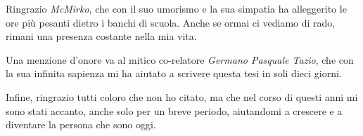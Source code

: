 Ringrazio \textit{McMirko}, che con il suo umorismo e la sua simpatia ha alleggerito le ore più pesanti dietro i banchi di scuola. Anche se ormai ci vediamo di rado, rimani una presenza costante nella mia vita.

Una menzione d'onore va al mitico co-relatore \textit{Germano Pasquale Tazio}, che con la sua infinita sapienza mi ha aiutato a scrivere questa tesi in soli dieci giorni.

Infine, ringrazio tutti coloro che non ho citato, ma che nel corso di questi anni mi sono stati accanto, anche solo per un breve periodo, aiutandomi a crescere e a diventare la persona che sono oggi.